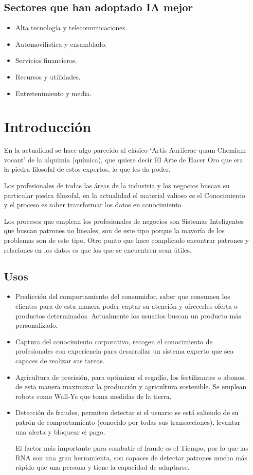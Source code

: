 \documentclass[12pt, twoside, openright]{report} %
\begin{document}
\subsection{Sectores que han adoptado IA mejor}
\begin{itemize}
	\item Alta tecnología y telecomunicaciones.
	\item Automovilística y ensamblado.
	\item Servicios financieros.
	\item Recursos y utilidades.
	\item Entretenimiento y media.
\end{itemize}

\section{Introducción}
En la actualidad se hace algo parecido al clásico ‘Artis Auriferae quam Chemiam vocant’ de la alquimia (química), que quiere decir El Arte de Hacer Oro que era la piedra filosofal de estos expertos, lo que les da poder.

Los profesionales de todas las áreas de la industria y los negocios buscan su particular piedra filosofal, en la actualidad el material valioso es el Conocimiento y el proceso es saber transformar los datos en conocimiento.

Los procesos que emplean los profesionales de negocios son Sistemas Inteligentes que buscan patrones no lineales, son de este tipo porque la mayoría de los problemas son de este tipo. Otro punto que hace complicado encontrar patrones y relaciones en los datos es que los que se encuentren sean útiles.

\subsection{Usos}
\begin{itemize}
	\item Predicción del comportamiento del consumidor, saber que consumen los clientes para de esta manera poder captar su atención y ofrecerles oferta o productos determinados. Actualmente los usuarios buscan un producto más personalizado.
	\item Captura del conocimiento corporativo, recogen el conocimiento de profesionales con experiencia para desarrollar un sistema experto que sea capaces de realizar sus tareas.
	\item Agricultura de precisión, para optimizar el regadío, los fertilizantes o abonos, de esta manera maximizar la producción y agricultura sostenible. Se emplean robots como Wall-Ye que toma medidas de la tierra.
	\item Detección de fraudes, permiten detectar si el usuario se está saliendo de su patrón de comportamiento (conocido por todas sus transacciones), levantar una alerta y bloquear el pago.

	      El factor más importante para combatir el fraude es el Tiempo, por lo que las RNA son una gran herramienta, son capaces de detectar patrones mucho más rápido que una persona y tiene la capacidad de adaptarse.
\end{itemize}
\pagebreak
\end{document}
